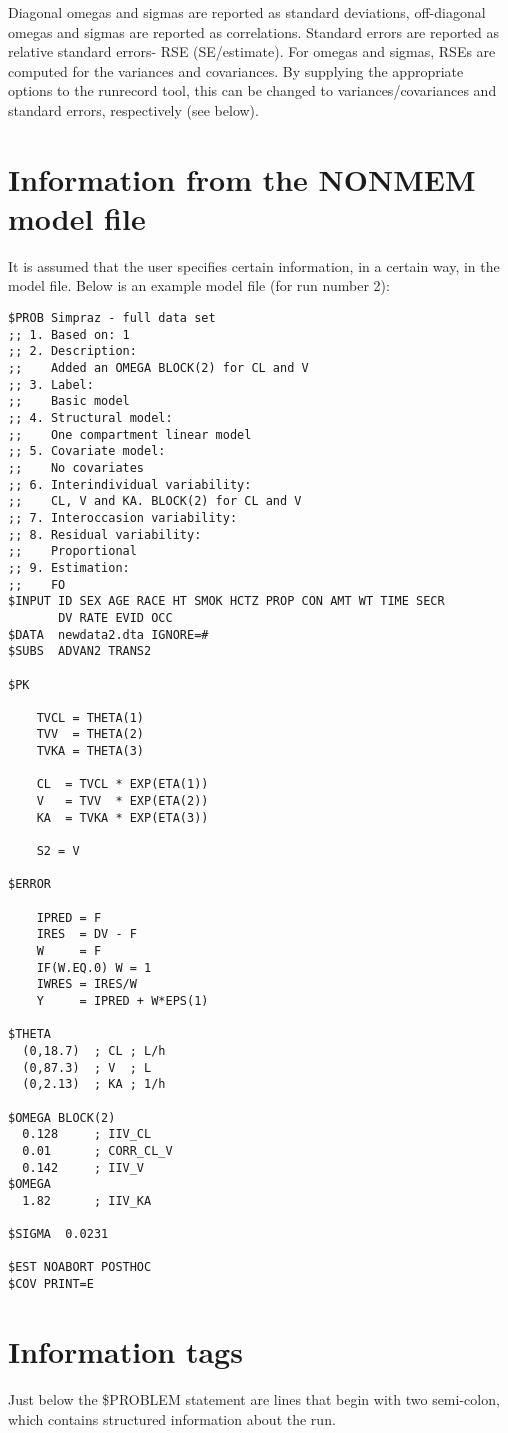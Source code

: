 Diagonal omegas and sigmas are reported as standard deviations, off-diagonal omegas and sigmas are reported as correlations. Standard errors are reported as relative standard errors- RSE (SE/estimate). For omegas and sigmas, RSEs are computed for the variances and covariances. By supplying the appropriate options to the runrecord tool, this can be changed to variances/covariances and standard errors, respectively (see below).

\section{Information from the NONMEM model file}
It is assumed that the user specifies certain information, in a certain way, in the model file. Below is an example model file (for run number 2):

\begin{verbatim}
$PROB Simpraz - full data set
;; 1. Based on: 1
;; 2. Description:
;;    Added an OMEGA BLOCK(2) for CL and V
;; 3. Label:
;;    Basic model
;; 4. Structural model:
;;    One compartment linear model
;; 5. Covariate model:
;;    No covariates
;; 6. Interindividual variability:
;;    CL, V and KA. BLOCK(2) for CL and V
;; 7. Interoccasion variability:
;; 8. Residual variability:
;;    Proportional
;; 9. Estimation:
;;    FO
$INPUT ID SEX AGE RACE HT SMOK HCTZ PROP CON AMT WT TIME SECR
       DV RATE EVID OCC
$DATA  newdata2.dta IGNORE=#
$SUBS  ADVAN2 TRANS2

$PK 

    TVCL = THETA(1)
    TVV  = THETA(2)
    TVKA = THETA(3)

    CL  = TVCL * EXP(ETA(1))
    V   = TVV  * EXP(ETA(2))
    KA  = TVKA * EXP(ETA(3))

    S2 = V

$ERROR 

    IPRED = F
    IRES  = DV - F
    W     = F
    IF(W.EQ.0) W = 1
    IWRES = IRES/W
    Y     = IPRED + W*EPS(1)

$THETA 
  (0,18.7)  ; CL ; L/h
  (0,87.3)  ; V  ; L
  (0,2.13)  ; KA ; 1/h

$OMEGA BLOCK(2)
  0.128     ; IIV_CL
  0.01      ; CORR_CL_V
  0.142     ; IIV_V
$OMEGA
  1.82      ; IIV_KA

$SIGMA  0.0231 

$EST NOABORT POSTHOC
$COV PRINT=E
\end{verbatim}
\newpage
\section{Information tags}
Just below the \$PROBLEM statement are lines that begin with two semi-colon, which contains structured information about the run. 

